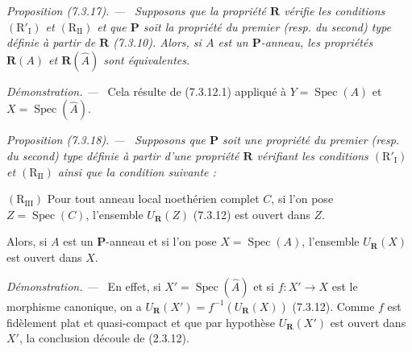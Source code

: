 \documentclass[10pt,oneside]{book}
\newenvironment{proposition}[1][]{%
  \par\medskip\noindent\itshape Proposition (#1). ---\ }{\par}
\newenvironment{proof}{%
  \par\medskip\noindent\textit{Démonstration. ---\ }}{\par}
\begin{document}
\begin{proposition}[7.3.17]
\label{IV.2.s7.3.17-fr}
Supposons que la propriété $\boldsymbol R$ vérifie les conditions
$(\mathrm R'_{\mathrm I})$ et $(\mathrm R_{\mathrm{II}})$ et que
$\boldsymbol P$ soit la propriété du premier (resp. du second) type
définie à partir de $\boldsymbol R$ (7.3.10). Alors, si $A$ est un
$\boldsymbol P$-anneau, les propriétés $\boldsymbol R(A)$ et
$\boldsymbol R(\widehat A)$ sont équivalentes.
\end{proposition}

\begin{proof}
Cela résulte de (7.3.12.1) appliqué à
$Y=\operatorname{Spec}(A)$ et $X=\operatorname{Spec}(\widehat A)$.
\end{proof}

\begin{proposition}[7.3.18]
\label{IV.2.s7.3.18-fr}
Supposons que $\boldsymbol P$ soit une propriété du premier (resp. du
second) type définie à partir d'une propriété $\boldsymbol R$ vérifiant
les conditions $(\mathrm R'_{\mathrm I})$ et
$(\mathrm R_{\mathrm{II}})$ ainsi que la condition suivante :

$(\mathrm R_{\mathrm{III}})$ Pour tout anneau local noethérien complet
$C$, si l'on pose $Z=\operatorname{Spec}(C)$, l'ensemble
$U_{\boldsymbol R}(Z)$ (7.3.12) est ouvert dans $Z$.

Alors, si $A$ est un $\boldsymbol P$-anneau et si l'on pose
$X=\operatorname{Spec}(A)$, l'ensemble $U_{\boldsymbol R}(X)$ est ouvert
dans $X$.
\end{proposition}

\begin{proof}
En effet, si $X'=\operatorname{Spec}(\widehat A)$ et si $f:X'\to X$ est
le morphisme canonique, on a
$U_{\boldsymbol R}(X')=f^{-1}(U_{\boldsymbol R}(X))$ (7.3.12). Comme $f$
est fidèlement plat et quasi-compact et que par hypothèse
$U_{\boldsymbol R}(X')$ est ouvert dans $X'$, la conclusion découle de
(2.3.12).
\end{proof}
\end{document}
